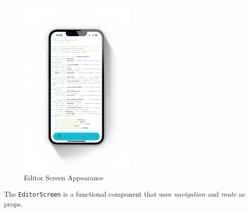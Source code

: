 \begin{figure}[!ht]
    \centering
    \includegraphics[width=0.5\textwidth]
    {LATEX/Appendices/Images/Software/Frontend/editor_screen.png}
    \caption{Editor Screen Appearance}
    \label{fig:editor screen}
\end{figure}

The \texttt{EditorScreen} is a functional component that uses \textit{navigation} and \textit{route} as props.

